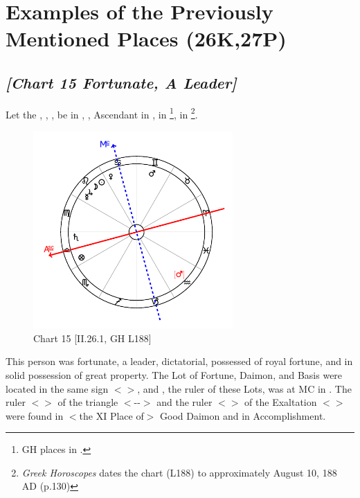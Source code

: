 \section{Examples of the Previously Mentioned Places (26K,27P)}

\subsection*{\textit{[Chart 15 Fortunate, A Leader]}}

Let the \Sun, \Moon, \Jupiter, \Mercury\xspace be in \Leo, \Saturn, Ascendant in \Libra, \Mars\xspace in \Gemini \footnote{GH places \Mars\xspace in \Aquarius.}, \Venus\xspace in \Cancer
\footnote{\textit{Greek Horoscopes} dates the chart (L188) to approximately August 10, 188 AD (p.130)}.

\clearpage
\begin{figure}
\centering
\vspace{-20pt}
\includegraphics[width=0.68\textwidth]{charts/2_26_1}
\caption{Chart 15 [II.26.1, GH L188]}
\label{fig:chart15}
\end{figure}

This person was fortunate, a leader, dictatorial, possessed of royal fortune, and in solid possession of great property. The Lot of Fortune, Daimon, and Basis were located in the same sign $<$\Libra$>$, and \Venus, the ruler of these Lots, was at MC in \Cancer. The ruler $<$\Jupiter$>$ of the triangle $<$\Leo-\Aries-\Sagittarius$>$ and the ruler $<$\Mercury$>$ of the Exaltation $<$\Gemini$>$ were found in $<$the XI Place of$>$ Good Daimon and in Accomplishment.

